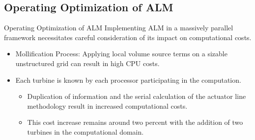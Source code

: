 \documentclass[10pt]{beamer}
\begin{document}
\subsection{Operating Optimization of ALM}

\begin{frame}{Operating Optimization of ALM}
Implementing ALM in a massively parallel framework necessitates careful consideration of its impact on computational costs.
\begin{itemize}
\justifying
\item[\ding{252}] Mollification Process: Applying local volume source terms on a sizable unstructured grid can result in high CPU costs.
\end{itemize}
\noindent\makebox[\linewidth]{\rule{\paperwidth}{0.4pt}}
\noindent\makebox[\linewidth]{\rule{\paperwidth}{0.4pt}}
\begin{itemize}
\item[\ding{252}] Each turbine is known by each processor participating in the computation. 
\begin{itemize}
\justifying
\item[\ding{212}] Duplication of information and the serial calculation of the actuator line methodology result in increased computational costs.
\item[\ding{212}] This cost increase remains around two percent with the addition of two turbines in the computational domain.
\end{itemize}
\end{itemize}
\end{frame}
\end{document}
